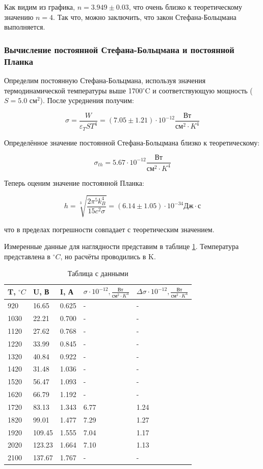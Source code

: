 \documentclass[a4paper,12pt]{article} %
\begin{document}
Как видим из графика, $n = 3.949 \pm 0.03$, что очень близко к теоретическому значению $n = 4$. Так что, можно заключить, что закон Стефана-Больцмана выполняется.

\subsubsection * {Вычисление постоянной Стефана-Больцмана и постоянной Планка}

Определим постоянную Стефана-Больцмана, используя значения термодинамической температуры выше 1700$^{\circ}$C и соответствующую мощность ($S = 5.0$ см$^2$). После усреднения получим:

\[\sigma = \frac{W}{\varepsilon_T S T^4} = (7.05 \pm 1.21) \cdot 10^{-12} \frac{Вт}{см^2 \cdot K^4}\]

Определённое значение постоянной Стефана-Больцмана близко к теоретическому:

\[\sigma_{th} = 5.67\cdot 10^{-12} \frac{Вт}{см^2 \cdot K^4}\]

Теперь оценим значение постоянной Планка:

\[ h = \sqrt[3]{\frac{2 \pi^5 k_B^4}{15 c^2 \sigma}} = (6.14 \pm 1.05) \cdot 10^{-34} \text{Дж} \cdot \text{с}\]

что в пределах погрешности совпадает с теоретическим значением.

Измеренные данные для наглядности представим в таблице \ref{tab:data}. Температура представлена в $^\circ C$, но расчёты проводились в K.

\begin{table}[h!]
\caption{Таблица с данными}
\label{tab:data}
\begin{tabular}{|l|l|l|l|l|}
\hline
T, $^\circ C$    & U, В      & I, А     & $\sigma \cdot 10^{-12}, \frac{Вт}{см^2 \cdot K^4}$  & $\Delta \sigma \cdot 10^{-12}, \frac{Вт}{см^2 \cdot K^4}$ \\ \hline
920  & 16.65  & 0.625 & -    & -    \\ \hline
1030 & 22.21  & 0.700 & -    & -    \\ \hline
1120 & 27.62  & 0.768 & -    & -    \\ \hline
1220 & 33.99  & 0.845 & -    & -    \\ \hline
1320 & 40.84  & 0.922 & -    & -    \\ \hline
1420 & 31.48  & 1.036 & -    & -    \\ \hline
1520 & 56.47  & 1.093 & -    & -    \\ \hline
1620 & 66.79  & 1.192 & -    & -    \\ \hline
1720 & 83.13  & 1.343 & 6.77 & 1.24 \\ \hline
1820 & 99.01  & 1.477 & 7.29 & 1.27 \\ \hline
1920 & 109.45 & 1.555 & 7.04 & 1.17 \\ \hline
2020 & 123.23 & 1.664 & 7.10 & 1.13 \\ \hline
2100 & 137.67 & 1.767 & -    & -    \\ \hline
\end{tabular}
\end{table}
\end{document}
